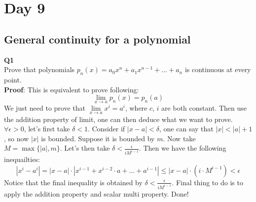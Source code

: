 \documentclass{article}
\newcommand{\tb}[1]{\textbf{#1}}
\begin{document}
\section{Day 9}
\subsection{General continuity for a polynomial}
\tb{Q1}\\
Prove that polynomials $p_n(x) = a_0 x^n +a_1 x^{n-1} + \dots + a_n$ is continuous at every point.\\
\tb{Proof}: This is equivalent to prove following:
$$
\lim_{x \to a} p_n(x) = p_n(a)
$$
We just need to prove that $\lim\limits_{x \to a}x^i =  a^i$, where $c$, $i$ are both constant. Then use the addition property of limit, 
one can then deduce what we want to prove. $\forall \epsilon > 0$, let's first take $\delta < 1$. Consider if $|x-a|< \delta$,
one can say that $|x|<|a|+ 1$, so now $|x|$ is bounded. Suppose it is bounded by $m$. Now take $M = \max\{|a|, m\}$. Let's then take $\delta < \frac{\epsilon}{iM^{i-1}}$.
Then we have the following inequailties:
$$
|x^i - a^i| = |x-a|\cdot|x^{i-1}+x^{i-2}\cdot a + \dots + a^{i-1}|\leq |x-a|\cdot(i \cdot M^{i-1})<\epsilon
$$
Notice that the final inequality is obtained by $\delta < \frac{\epsilon}{iM^{i-1}}$. Final thing to do is to apply the addition property and scalar multi property. Done!\\
\\
\\
\\
\\
\\
\end{document}
